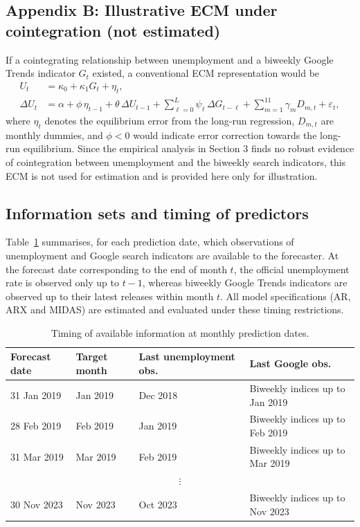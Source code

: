 \documentclass[12pt,a4paper]{article}
\begin{document}
\subsection{Appendix B: Illustrative ECM under cointegration (not estimated)}

If a cointegrating relationship between unemployment and a biweekly Google Trends indicator $G_t$ existed, a conventional ECM representation would be
\begin{align}
U_t &= \kappa_0 + \kappa_1 G_t + \eta_t, \\
\Delta U_t &= \alpha
+ \phi \, \eta_{t-1}
+ \theta \, \Delta U_{t-1}
+ \sum_{\ell=0}^{L} \psi_\ell \, \Delta G_{t-\ell}
+ \sum_{m=1}^{11} \gamma_m D_{m,t}
+ \varepsilon_t,
\end{align}
where $\eta_t$ denotes the equilibrium error from the long-run regression, $D_{m,t}$ are monthly dummies, and $\phi < 0$ would indicate error correction towards the long-run equilibrium. Since the empirical analysis in Section 3 finds no robust evidence of cointegration between unemployment and the biweekly search indicators, this ECM is not used for estimation and is provided here only for illustration.






\subsection{Information sets and timing of predictors}
\label{app:timing}

Table~\ref{tab:timing} summarises, for each prediction date, which observations of unemployment and Google search indicators are available to the forecaster. At the forecast date corresponding to the end of month $t$, the official unemployment rate is observed only up to $t-1$, whereas biweekly Google Trends indicators are observed up to their latest releases within month $t$. All model specifications (AR, ARX and MIDAS) are estimated and evaluated under these timing restrictions.

\begin{table}[h!]
    \centering
    \caption{Timing of available information at monthly prediction dates.}
    \label{tab:timing}
    \begin{tabular}{llll}
        \toprule
        Forecast date & Target month & Last unemployment obs. & Last Google obs. \\
        \midrule
        31 Jan 2019 & Jan 2019 & Dec 2018 & Biweekly indices up to Jan 2019 \\
        28 Feb 2019 & Feb 2019 & Jan 2019 & Biweekly indices up to Feb 2019 \\
        31 Mar 2019 & Mar 2019 & Feb 2019 & Biweekly indices up to Mar 2019 \\
        \multicolumn{4}{c}{$\vdots$} \\
        30 Nov 2023 & Nov 2023 & Oct 2023 & Biweekly indices up to Nov 2023 \\
        \bottomrule
    \end{tabular}
\end{table}
\end{document}
